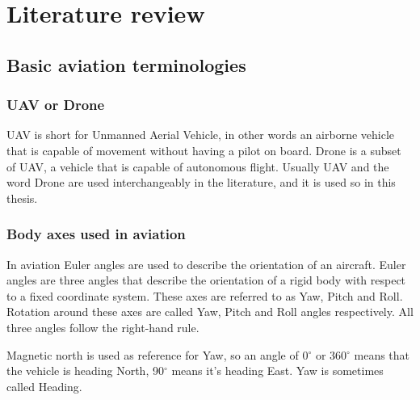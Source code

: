 \chapter{Literature review} \label{chap:literature_review}

\section{Basic aviation terminologies}

\subsection{UAV or Drone}
UAV is short for Unmanned Aerial Vehicle, in other words an airborne vehicle that is capable of movement
without having a pilot on board. Drone is a subset of UAV, a vehicle that is capable of autonomous flight.
Usually UAV and the word Drone are used interchangeably in the literature, and it is used so in this thesis.

\subsection{Body axes used in aviation}
In aviation Euler angles are used to describe the orientation of an aircraft. Euler angles are three angles
that describe the orientation of a rigid body with respect to a fixed coordinate system. These axes are 
referred to as Yaw, Pitch and Roll. Rotation around these axes are called Yaw, Pitch and Roll angles respectively.
All three angles follow the right-hand rule. 

Magnetic north is used as reference for Yaw, so an angle of 0$^\circ$ or 360$^\circ$ means that the vehicle
is heading North, 90$^\circ$ means it's heading East. Yaw is sometimes called Heading.

